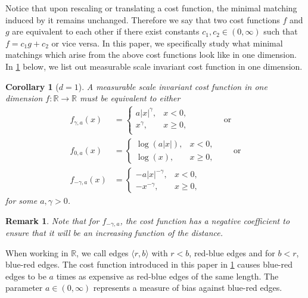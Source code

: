 \documentclass{article}
\newtheorem{corollary}{Corollary}
\newtheorem{remark}{Remark}
\newcommand{\R}{\mathbb{R}}
\begin{document}
Notice that upon rescaling or translating a cost function, the minimal
matching induced by it remains unchanged. Therefore we say that two
cost functions $f$ and $g$ are equivalent to each other if there exist
constants $c_1,c_2\in(0,\infty)$ such that $f = c_1 g + c_2 $ or vice versa.
In this paper, we
specifically study what minimal matchings which arise from the above
cost functions look like in one dimension. In
\cref{cor:unbalcost_onedim} below, we list out
measurable scale invariant cost function in one dimension.

\begin{samepage}
  \begin{corollary}[$d=1$]\label{cor:unbalcost_onedim}
  A measurable scale invariant cost function in one dimension
  $f:\R\rightarrow\R$ must be equivalent to either
  \begin{align}
    \label{eq:costonedim}
    f_{\gamma,a}(x) &=
    \begin{cases}
      a|x|^\gamma, & x<0,\\
      x^\gamma, & x\geq 0,\\
    \end{cases} \qquad\qquad \mbox {or} \\
    f_{0,a}(x) &=
           \begin{cases}
             \log (a|x|) , & x<0,\\
             \log(x)  , & x\geq 0,
           \end{cases} \qquad \mbox{or}\nonumber\\
   f_{-\gamma,a}(x)&=
           \begin{cases}
             -a |x|^{-\gamma} ,& x<0,\nonumber\\             -
             x^{-\gamma}, & x\geq 0,
           \end{cases}
  \end{align}
  for some $a,\gamma>0$.
\end{corollary}
\end{samepage}




\begin{remark}
Note that for $f_{-\gamma,a}$, the cost function has
a negative coefficient to ensure that it will be an increasing
function of the distance. \end{remark}

When working in $\R$, we call edges $\langle r,b \rangle$ with $r<b$, red-blue edges and for
$b<r$, blue-red edges. The cost function introduced
in this paper in
\cref{cor:unbalcost_onedim} causes blue-red edges to be $a$ times as
expensive as red-blue edges of the same length. The parameter $a\in(0,\infty)$
represents a measure of bias against blue-red edges.
\end{document}
